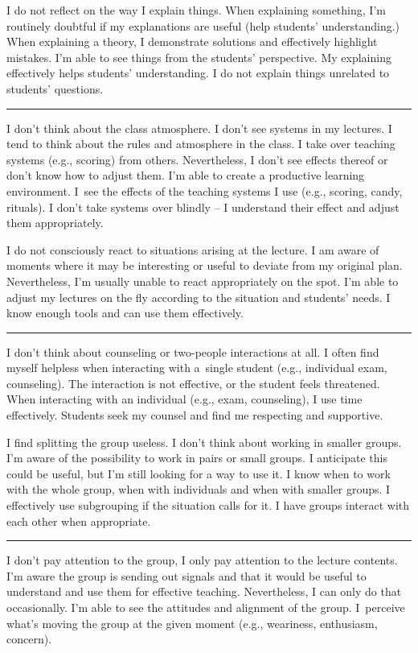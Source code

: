 \newpage
{}
{I do not reflect on the way I explain things.}
{When explaining something, I'm routinely doubtful if my explanations are useful (help students' understanding.)}
{When explaining a theory, I demonstrate solutions and effectively highlight mistakes. I'm able to see things from the students' perspective. My explaining effectively helps students' understanding. I do not explain things unrelated to students' questions.}

\rule{\textwidth}{0.4pt}
{I don't think about the class atmosphere. I don't see systems in my lectures.}
{I tend to think about the rules and atmosphere in the class. I take over teaching systems (e.g., scoring) from others. Nevertheless, I don't see effects thereof or don't know how to adjust them.}
{I'm able to create a productive learning environment. I~see the effects of the teaching systems I use (e.g., scoring, candy, rituals). I don't take systems over blindly -- I understand their effect and adjust them appropriately.}

\newpage
{}
{I do not consciously react to situations arising at the lecture.}
{I am aware of moments where it may be interesting or useful to deviate from my original plan. Nevertheless, I'm usually unable to react appropriately on the spot.}
{I'm able to adjust my lectures on the fly according to the situation and students' needs. I know enough tools and can use them effectively.}

\rule{\textwidth}{0.4pt}
{I don't think about counseling or two-people interactions at all.}
{I often find myself helpless when interacting with a~single student (e.g., individual exam, counseling). The interaction is not effective, or the student feels threatened.}
{When interacting with an individual (e.g., exam, counseling), I use time effectively. Students seek my counsel and find me respecting and supportive.}

\newpage
{}
{I find splitting the group useless. I don't think about working in smaller groups.}
{I'm aware of the possibility to work in pairs or small groups. I anticipate this could be useful, but I'm still looking for a way to use it.}
{I know when to work with the whole group, when with individuals and when with smaller groups. I effectively use subgrouping if the situation calls for it. I have groups interact with each other when appropriate.}

\rule{\textwidth}{0.4pt}
{I don't pay attention to the group, I only pay attention to the lecture contents.}
{I'm aware the group is sending out signals and that it would be useful to understand and use them for effective teaching. Nevertheless, I can only do that occasionally.}
{I'm able to see the attitudes and alignment of the group. I~perceive what's moving the group at the given moment (e.g., weariness, enthusiasm, concern).}
